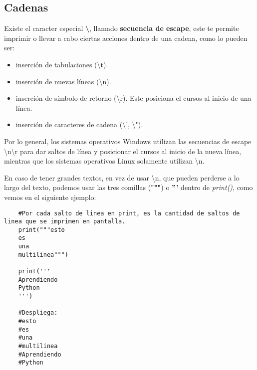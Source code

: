 \subsection{Cadenas}
\hspace{0.55cm}Existe el caracter especial \textbf{\textbackslash}, llamado \textbf{secuencia de escape}, este te permite imprimir o llevar a cabo ciertas acciones dentro de una cadena, como lo pueden ser:
\begin{itemize}
	\item inserción de tabulaciones (\textbackslash t).
	\item inserción de nuevas líneas (\textbackslash n).
	\item inserción de símbolo de retorno (\textbackslash r). Este posiciona el cursos al inicio de una línea.
	\item inserción de caracteres de cadena (\textbackslash ', \textbackslash ").
\end{itemize}

Por lo general, los sistemas operativos Windows utilizan las secuencias de escape \textbackslash n\textbackslash r para dar saltos de línea y posicionar el cursos al inicio de la nueva línea, mientras que los sistemas operativos Linux solamente utilizan \textbackslash n.

En caso de tener grandes textos, en vez de usar \textbackslash n, que pueden perderse a lo largo del texto, podemos usar las tres comillas (\textbf{"""}) o \textbf{'''} dentro de \textit{print()}, como vemos en el siguiente ejemplo:
\begin{lstlisting}
	#Por cada salto de linea en print, es la cantidad de saltos de linea que se imprimen en pantalla.
	print("""esto
	es
	una
	multilinea""")
	
	print('''
	Aprendiendo
	Python	
	''')
	
	#Despliega:
	#esto
	#es
	#una
	#multilinea
	#Aprendiendo
	#Python
\end{lstlisting}


